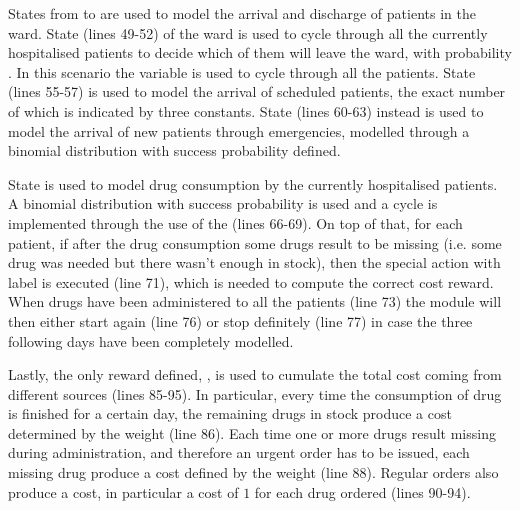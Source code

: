 {      States from  to  are used to model the arrival and discharge of patients in the ward. State  (lines 49-52) of the ward is used to cycle through all the currently hospitalised patients to decide which of them will leave the ward, with probability . In this scenario the  variable is used to cycle through all the patients. State  (lines 55-57) is used to model the arrival of scheduled patients, the exact number of which is indicated by three constants. State  (lines 60-63) instead is used to model the arrival of new patients through emergencies, modelled through a binomial distribution with success probability  defined.
      
      State  is used to model drug consumption by the currently hospitalised patients. A binomial distribution with success probability  is used and a cycle is implemented through the use of the  (lines 66-69). On top of that, for each patient, if after the drug consumption some drugs result to be missing (i.e. some drug was needed but there wasn't enough in stock), then the special action with label  is executed (line 71), which is needed to compute the correct cost reward. When drugs have been administered to all the patients (line 73) the module will then either start again (line 76) or stop definitely (line 77) in case the three following days have been completely modelled.
      
      Lastly, the only reward defined, , is used to cumulate the total cost coming from different sources (lines 85-95). In particular, every time the consumption of drug is finished for a certain day, the remaining drugs in stock produce a cost determined by the weight  (line 86). Each time one or more drugs result missing during administration, and therefore an urgent order has to be issued, each missing drug produce a cost defined by the weight  (line 88). Regular orders also produce a cost, in particular a cost of $1$ for each drug ordered (lines 90-94).
    }
    
